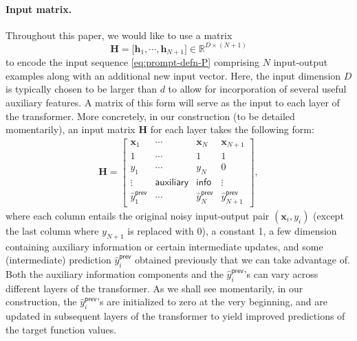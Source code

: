 \documentclass[english]{article}
\begin{document}
\paragraph{Input matrix.} 
Throughout this paper, 
we would like to use a matrix 
%
\begin{equation}
    \bm{H} = \big[\bm{h}_1, \cdots, \bm{h}_{N+1} \big] \in \mathbb{R}^{D\times (N+1)}
	\label{eq:input-matrix-H}
\end{equation}
%
to encode the input sequence \eqref{eq:prompt-defn-P} comprising $N$ input-output examples along with an additional new input vector. 
Here, the input dimension $D$ is typically chosen to be larger than $d$ to allow for incorporation of several useful auxiliary features. 
A matrix of this form will serve as the input to each layer of the transformer. 
%
More concretely, in our construction (to be detailed momentarily), an input matrix $\bm{H}$ for each layer takes the following form:  
%
\begin{align}
\bm{H}=\left[\begin{array}{cccc}
\bm{x}_{1} & \cdots & \bm{x}_{N} & \bm{x}_{N+1}\\
1 & \cdots & 1 & 1\\
y_{1} & \cdots & y_{N} & 0\\
\vdots & \mathsf{auxiliary} & \mathsf{info} & \vdots\\
	\widehat{y}_{1}^{\mathsf{prev}} & \cdots & \widehat{y}_{N}^{\mathsf{prev}} & \widehat{y}_{N+1}^{\mathsf{prev}}
\end{array}\right],
\label{eq:input-matrix-H-detailed}
\end{align}
%
where each column entails the original noisy input-output pair $(\bm{x}_i,y_i)$ (except the last column where $y_{N+1}$ is replaced with 0), a constant 1, a few dimension containing auxiliary information or certain intermediate updates, and some (intermediate) prediction $\widehat{y}_i^{\mathsf{prev}}$ obtained previously that we can take advantage of. 
Both the auxiliary information components and the $\widehat{y}_i^{\mathsf{prev}}$'s can vary across different layers of the transformer. 
As we shall see momentarily, in our construction,  the $\widehat{y}_i^{\mathsf{prev}}$'s are initialized to zero at the very beginning, and are updated in subsequent layers of the transformer to yield improved predictions of the target function values.
\end{document}
